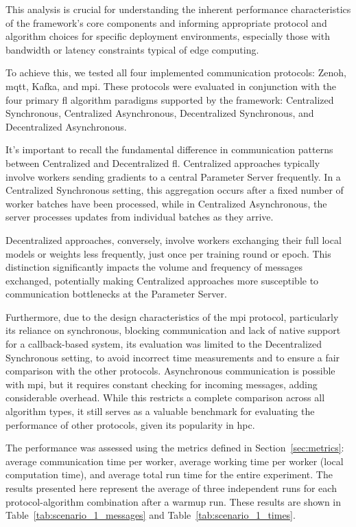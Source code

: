 This analysis is crucial for understanding the inherent performance characteristics of the framework's core components and informing appropriate protocol and algorithm choices for specific deployment environments, especially those with bandwidth or latency constraints typical of edge computing.

To achieve this, we tested all four implemented communication protocols: Zenoh, \ac{mqtt}, Kafka, and \ac{mpi}. These protocols were evaluated in conjunction with the four primary \ac{fl} algorithm paradigms supported by the framework: Centralized Synchronous, Centralized Asynchronous, Decentralized Synchronous, and Decentralized Asynchronous. 

It's important to recall the fundamental difference in communication patterns between Centralized and Decentralized \ac{fl}. Centralized approaches typically involve workers sending gradients to a central Parameter Server frequently. In a Centralized Synchronous setting, this aggregation occurs after a fixed number of worker batches have been processed, while in Centralized Asynchronous, the server processes updates from individual batches as they arrive.

Decentralized approaches, conversely, involve workers exchanging their full local models or weights less frequently, just once per training round or epoch. This distinction significantly impacts the volume and frequency of messages exchanged, potentially making Centralized approaches more susceptible to communication bottlenecks at the Parameter Server.

Furthermore, due to the design characteristics of the \ac{mpi} protocol, particularly its reliance on synchronous, blocking communication and lack of native support for a callback-based system, its evaluation was limited to the Decentralized Synchronous setting, to avoid incorrect time measurements and to ensure a fair comparison with the other protocols. Asynchronous communication is possible with \ac{mpi}, but it requires constant checking for incoming messages, adding considerable overhead. While this restricts a complete comparison across all algorithm types, it still serves as a valuable benchmark for evaluating the performance of other protocols, given its popularity in \ac{hpc}.

The performance was assessed using the metrics defined in Section~\ref{sec:metrics}: average communication time per worker, average working time per worker (local computation time), and average total run time for the entire experiment. The results presented here represent the average of three independent runs for each protocol-algorithm combination after a warmup run. These results are shown in Table~\ref{tab:scenario_1_messages} and Table~\ref{tab:scenario_1_times}.

